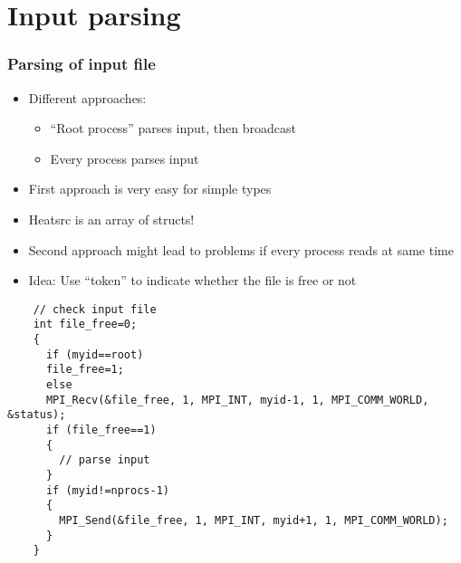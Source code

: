 \section{Input parsing}
\begin{frame}
  \frametitle{Parsing of input file}
  \begin{itemize}
  \item Different approaches:
    \begin{itemize}
    \item ``Root process'' parses input, then broadcast
    \item Every process parses input
    \end{itemize}
  \item First approach is very easy for simple types
  \item Heatsrc is an array of structs!
  \item Second approach might lead to problems if every process reads at same time
  \item Idea: Use ``token'' to indicate whether the file is free or not
  \end{itemize}
\end{frame}

\begin{frame}[fragile]
  \begin{lstlisting}
    // check input file
    int file_free=0;
    {
      if (myid==root)
      file_free=1;
      else
      MPI_Recv(&file_free, 1, MPI_INT, myid-1, 1, MPI_COMM_WORLD, &status);
      if (file_free==1)
      {
        // parse input      
      }
      if (myid!=nprocs-1)
      {
        MPI_Send(&file_free, 1, MPI_INT, myid+1, 1, MPI_COMM_WORLD);
      }
    }
  \end{lstlisting}

\end{frame}
